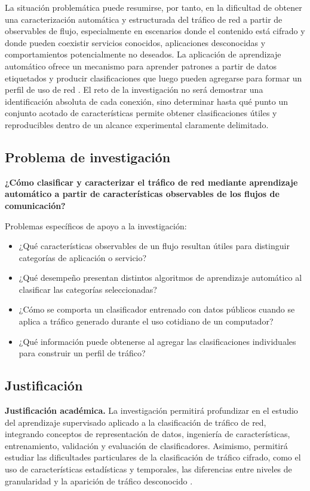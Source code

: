 \documentclass[conference]{IEEEtran}
\begin{document}
La situación problemática puede resumirse, por tanto, en la dificultad de obtener una caracterización automática y estructurada del tráfico de red a partir de observables de flujo, especialmente en escenarios donde el contenido está cifrado y donde pueden coexistir servicios conocidos, aplicaciones desconocidas y comportamientos potencialmente no deseados. La aplicación de aprendizaje automático ofrece un mecanismo para aprender patrones a partir de datos etiquetados y producir clasificaciones que luego pueden agregarse para formar un perfil de uso de red \cite{shen2023,aceto2021,roy2022}. El reto de la investigación no será demostrar una identificación absoluta de cada conexión, sino determinar hasta qué punto un conjunto acotado de características permite obtener clasificaciones útiles y reproducibles dentro de un alcance experimental claramente delimitado.

\subsection{Problema de investigación}

\textbf{¿Cómo clasificar y caracterizar el tráfico de red mediante aprendizaje automático a partir de características observables de los flujos de comunicación?}

Problemas específicos de apoyo a la investigación:
\begin{itemize}
\item ¿Qué características observables de un flujo resultan útiles para distinguir categorías de aplicación o servicio?
\item ¿Qué desempeño presentan distintos algoritmos de aprendizaje automático al clasificar las categorías seleccionadas?
\item ¿Cómo se comporta un clasificador entrenado con datos públicos cuando se aplica a tráfico generado durante el uso cotidiano de un computador?
\item ¿Qué información puede obtenerse al agregar las clasificaciones individuales para construir un perfil de tráfico?
\end{itemize}

\subsection{Justificación}

\textbf{Justificación académica.} La investigación permitirá profundizar en el estudio del aprendizaje supervisado aplicado a la clasificación de tráfico de red, integrando conceptos de representación de datos, ingeniería de características, entrenamiento, validación y evaluación de clasificadores. Asimismo, permitirá estudiar las dificultades particulares de la clasificación de tráfico cifrado, como el uso de características estadísticas y temporales, las diferencias entre niveles de granularidad y la aparición de tráfico desconocido \cite{shen2023,jin2024,liang2024,afuwape2021,pathmaperuma2022}.
\end{document}
